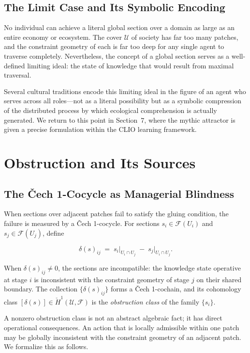 \documentclass[12pt]{article}
\begin{document}
\subsection{The Limit Case and Its Symbolic Encoding}

No individual can achieve a literal global section over a domain as large as an entire economy or ecosystem. The cover $\mathcal{U}$ of society has far too many patches, and the constraint geometry of each is far too deep for any single agent to traverse completely. Nevertheless, the concept of a global section serves as a well-defined limiting ideal: the state of knowledge that would result from maximal traversal.

Several cultural traditions encode this limiting ideal in the figure of an agent who serves across all roles---not as a literal possibility but as a symbolic compression of the distributed process by which ecological comprehension is actually generated. We return to this point in Section~7, where the mythic attractor is given a precise formulation within the CLIO learning framework.

\section{Obstruction and Its Sources}

\subsection{The Čech 1-Cocycle as Managerial Blindness}

When sections over adjacent patches fail to satisfy the gluing condition, the failure is measured by a Čech 1-cocycle. For sections $s_i \in \mathcal{F}(U_i)$ and $s_j \in \mathcal{F}(U_j)$, define

\begin{equation}
\delta(s)_{ij} \;=\; s_i\big|_{U_i \cap U_j} \;-\; s_j\big|_{U_i \cap U_j}.
\end{equation}

When $\delta(s)_{ij} \neq 0$, the sections are incompatible: the knowledge state operative at stage $i$ is inconsistent with the constraint geometry of stage $j$ on their shared boundary. The collection $\{\delta(s)_{ij}\}$ forms a Čech 1-cochain, and its cohomology class $[\delta(s)] \in \check{H}^1(\mathcal{U}, \mathcal{F})$ is the \emph{obstruction class} of the family $\{s_i\}$.

A nonzero obstruction class is not an abstract algebraic fact; it has direct operational consequences. An action that is locally admissible within one patch may be globally inconsistent with the constraint geometry of an adjacent patch. We formalize this as follows.
\end{document}
